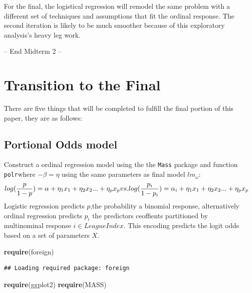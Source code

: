 \documentclass[]{article}
\newenvironment{Shaded}{\begin{snugshade}}{\end{snugshade}}
\newcommand{\KeywordTok}[1]{\textcolor[rgb]{0.13,0.29,0.53}{\textbf{#1}}}
\newcommand{\NormalTok}[1]{#1}
\begin{document}
For the final, the logistical regression will remodel the same problem
with a different set of techniques and assumptions that fit the ordinal
response. The second iteration is likely to be much smoother because of
this exploratory analysis's heavy leg work.

-- End Midterm 2 --

\hypertarget{transition-to-the-final}{%
\section{Transition to the Final}\label{transition-to-the-final}}

There are five things that will be completed to fulfill the final
portion of this paper, they are as follows:

\hypertarget{portional-odds-model}{%
\subsection{Portional Odds model}\label{portional-odds-model}}

Construct a ordinal regression model using the the \texttt{Mass} package
and function \texttt{polr}where \(-\beta=\eta\) using the same
parameters as final model \(lm_\omega\):
\[log(\frac{p}{1-p})=\alpha+\eta_1x_1+\eta_2x_2...+\eta_px_p\\ vs. \\log(\frac{p_i}{1-p_i})=\alpha_i+\eta_1x_1+\eta_2x_2...+\eta_px_p\]
Logistic regression predicts \(p\),the probability a binomial response,
alternatively ordinal regression predicts \(p_i\) the predictors
ceoffients partitioned by multinominal response \(i \in LeagueIndex\).
This encoding predicts the logit odds based on a set of parameters
\(X\).

\begin{Shaded}
\begin{Highlighting}[]
\KeywordTok{require}\NormalTok{(foreign)}
\end{Highlighting}
\end{Shaded}

\begin{verbatim}
## Loading required package: foreign
\end{verbatim}

\begin{Shaded}
\begin{Highlighting}[]
\KeywordTok{require}\NormalTok{(ggplot2)}
\KeywordTok{require}\NormalTok{(MASS)}
\end{Highlighting}
\end{Shaded}
\end{document}
